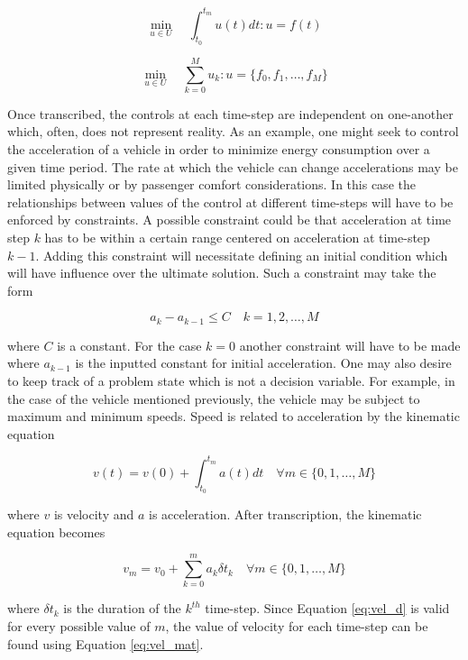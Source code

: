 \documentclass[12pt]{article}
\begin{document}
\begin{equation}
	\min_{u\in U}\quad \int_{t_0}^{t_m}u(t)dt: u=f(t) \label{eq:exc}
\end{equation}

\begin{equation}
	\min_{u\in U}\quad \sum_{k=0}^{M} u_k: u=\{f_0,f_1,\dots,f_M\} \label{eq:exd}
\end{equation}

Once transcribed, the controls at each time-step are independent on one-another which, often, does not represent reality. As an example, one might seek to control the acceleration of a vehicle in order to minimize energy consumption over a given time period. The rate at which the vehicle can change accelerations may be limited physically or by passenger comfort considerations. In this case the relationships between values of the control at different time-steps will have to be enforced by constraints. A possible constraint could be that acceleration at time step $k$ has to be within a certain range centered on acceleration at time-step $k-1$. Adding this constraint will necessitate defining an initial condition which will have influence over the ultimate solution. Such a constraint may take the form

\begin{equation}
	a_{k}-a_{k-1}\leq C \quad k=1,2,\dots,M
\end{equation}

where $C$ is a constant. For the case $k=0$ another constraint will have to be made where $a_{k-1}$ is the inputted constant for initial acceleration. One may also desire to keep track of a problem state which is not a decision variable. For example, in the case of the vehicle mentioned previously, the vehicle may be subject to maximum and minimum speeds. Speed is related to acceleration by the kinematic equation 


\begin{equation}
	v(t)=v(0)+\int_{t_0}^{t_m}a(t)dt \quad \forall m\in \{0,1,\dots,M\}
\end{equation}

where $v$ is velocity and $a$ is acceleration. After transcription, the kinematic equation becomes

\begin{equation}
	v_m=v_0+\sum_{k=0}^{m}a_k\delta t_k \quad \forall m\in \{0,1,\dots,M\}\label{eq:vel_d}
\end{equation}

where $\delta t_k$ is the duration of the  $k^{th}$ time-step. Since Equation \eqref{eq:vel_d} is valid for every possible value of $m$, the value of velocity for each time-step can be found using Equation \eqref{eq:vel_mat}.
\end{document}
